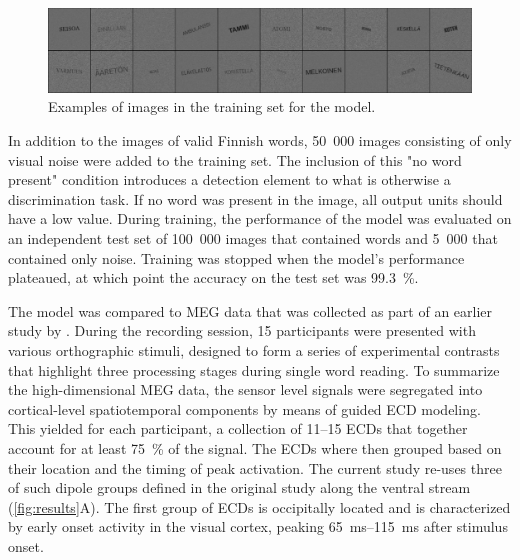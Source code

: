 \documentclass[a4paper, 10pt]{vanvliet_paper}
\begin{document}
\begin{figure}
    \includegraphics[width=\textwidth]{train.png}
    \caption{Examples of images in the training set for the model.}\label{fig:train}
\end{figure}

In addition to the images of valid Finnish words, 50~000 images consisting of only visual noise were added to the training set.
The inclusion of this "no word present" condition introduces a detection element to what is otherwise a discrimination task.
If no word was present in the image, all output units should have a low value.
During training, the performance of the model was evaluated on an independent test set of 100~000 images that contained words and 5~000 that contained only noise.
Training was stopped when the model's performance plateaued, at which point the accuracy on the test set was \SI{99.3}{\percent}.

The model was compared to \gls{MEG} data that was collected as part of an earlier study by \textcite{Vartiainen2011}.
During the recording session, 15 participants were presented with various orthographic stimuli, designed to form a series of experimental contrasts that highlight three processing stages during single word reading.
To summarize the high-dimensional \gls{MEG} data, the sensor level signals were segregated into cortical-level spatiotemporal components by means of guided \gls{ECD} modeling\cite{Hamalainen1993}.
This yielded for each participant, a collection of 11--15 \glspl{ECD} that together account for at least \SI{75}{\percent} of the signal.
The \glspl{ECD} where then grouped based on their location and the timing of peak activation. 
The current study re-uses three of such dipole groups defined in the original study\cite{Vartiainen2011} along the ventral stream (\autoref{fig:results}A).
The first group of \glspl{ECD} is occipitally located and is characterized by early onset activity in the visual cortex, peaking \SIrange{65}{115}{\milli\second} after stimulus onset.
\end{document}
